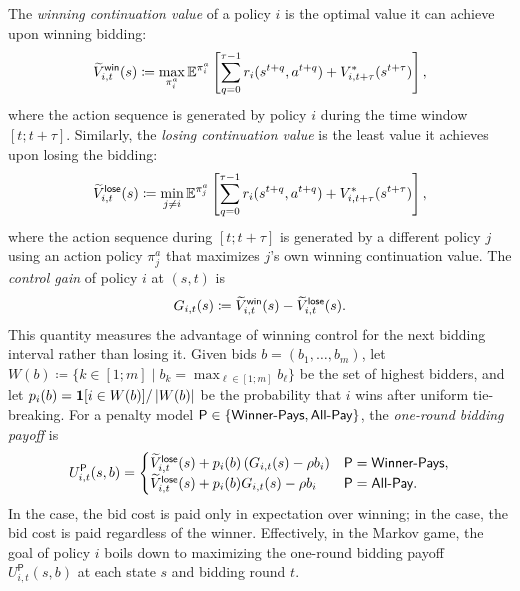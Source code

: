 The \textit{winning continuation value} of a policy $i$ is the optimal value it can achieve upon winning bidding:
\begin{equation}
	\widetilde V^{\mathsf{win}}_{i,t}(s)
	\coloneqq
	\max_{\pi_i^a}
	\mathbb{E}^{\pi_i^a}\left[
		\sum_{q=0}^{\tau-1} r_i(s^{t+q},a^{t+q})
		+V^*_{i,t+\tau}(s^{t+\tau})
	\right],
\end{equation}
where the action sequence is generated by policy \(i\) during the time window $[t;t+\tau]$.
Similarly, the \textit{losing continuation value} is the least value it achieves upon losing the bidding:
\begin{equation}\label{eq:losing continuation value}
	\widetilde V^{\mathsf{lose}}_{i,t}(s)
	\coloneqq
	\min_{j\neq i}
	\mathbb{E}^{\pi_j^a}\left[
		\sum_{q=0}^{\tau-1} r_i(s^{t+q},a^{t+q})
		+V^*_{i,t+\tau}(s^{t+\tau})
	\right],
\end{equation}
where the action sequence during $[t;t+\tau]$ is generated by a different policy \(j\) using an action policy $\pi_j^a$ that maximizes $j$'s own winning continuation value.
The \textit{control gain} of policy \(i\) at \((s,t)\) is
\begin{equation}
	G_{i,t}(s)
	\coloneqq
	\widetilde V^{\mathsf{win}}_{i,t}(s)-\widetilde V^{\mathsf{lose}}_{i,t}(s).
\end{equation}
This quantity measures the advantage of winning control for the next bidding interval rather than losing it.
Given bids \(b=(b_1,\ldots,b_m)\), let
$W(b)\coloneqq \{k\in [1;m]\mid b_k=\max_{\ell\in[1;m]}b_\ell\}$ 
be the set of highest bidders, and let \(p_i(b)=\mathbf{1}[i\in W(b)]/\left|W(b)\right|\) be the probability that \(i\) wins after uniform tie-breaking.
For a penalty model \(\mathsf{P}\in\{\textsf{Winner-Pays},\textsf{All-Pay}\}\), the \textit{one-round bidding payoff} is
\begin{equation}
	U^{\mathsf{P}}_{i,t}(s,b)
	=
	\begin{cases}
		\widetilde V^{\mathsf{lose}}_{i,t}(s)+p_i(b)\left(G_{i,t}(s)-\rho b_i\right) & \mathsf{P}=\textsf{Winner-Pays},\\
		\widetilde V^{\mathsf{lose}}_{i,t}(s)+p_i(b)G_{i,t}(s)-\rho b_i & \mathsf{P}=\textsf{All-Pay}.
	\end{cases}
\end{equation}
In the \poorman case, the bid cost is paid only in expectation over winning; in the \allpay case, the bid cost is paid regardless of the winner.
Effectively, in the Markov game, the goal of policy $i$ boils down to maximizing the one-round bidding payoff $U^{\mathsf{P}}_{i,t}(s,b)$ at each state $s$ and bidding round $t$. 

